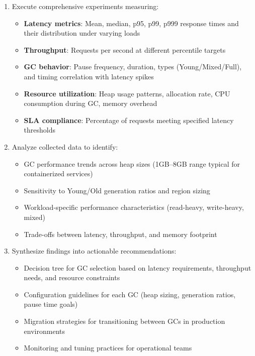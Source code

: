 \begin{enumerate}
    \item Execute comprehensive experiments measuring:
    \begin{itemize}
        \item \textbf{Latency metrics}: Mean, median, p95, p99, p999 response times and their distribution under varying loads
        \item \textbf{Throughput}: Requests per second at different percentile targets
        \item \textbf{GC behavior}: Pause frequency, duration, types (Young/Mixed/Full), and timing correlation with latency spikes
        \item \textbf{Resource utilization}: Heap usage patterns, allocation rate, CPU consumption during GC, memory overhead
        \item \textbf{SLA compliance}: Percentage of requests meeting specified latency thresholds
    \end{itemize}
    
    \item Analyze collected data to identify:
    \begin{itemize}
        \item GC performance trends across heap sizes (1GB--8GB range typical for containerized services)
        \item Sensitivity to Young/Old generation ratios and region sizing
        \item Workload-specific performance characteristics (read-heavy, write-heavy, mixed)
        \item Trade-offs between latency, throughput, and memory footprint
    \end{itemize}
    
    \item Synthesize findings into actionable recommendations:
    \begin{itemize}
        \item Decision tree for GC selection based on latency requirements, throughput needs, and resource constraints
        \item Configuration guidelines for each GC (heap sizing, generation ratios, pause time goals)
        \item Migration strategies for transitioning between GCs in production environments
        \item Monitoring and tuning practices for operational teams
    \end{itemize}
\end{enumerate}

